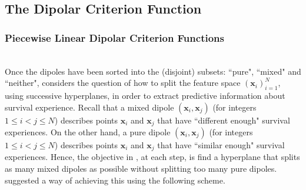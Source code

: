 \documentclass[12pt]{amsart}
\theoremstyle{definition}
\theoremstyle{plain}
\theoremstyle{remark}
\begin{document}
\subsection{The Dipolar Criterion Function}


\subsubsection{Piecewise Linear Dipolar Criterion Functions} \hfill \\


Once the dipoles have been sorted into the (disjoint) subsets: ``pure", ``mixed" and ``neither", \cite{kretowska} considers the question of how to split the feature space $(\mathbf{x}_i)_{i = 1}^N$, using successive hyperplanes, in order to extract predictive information about survival experience. Recall that a mixed dipole $(\mathbf{x}_i, \mathbf{x}_j)$ (for integers $1 \leq i < j \leq N$) describes points $\mathbf{x}_i$ and $\mathbf{x}_j$ that have ``different enough" survival experiences. On the other hand, a pure dipole $(\mathbf{x}_i, \mathbf{x}_j)$ (for integers $1 \leq i < j \leq N$) describes points $\mathbf{x}_i$ and $\mathbf{x}_j$ that have ``similar enough" survival experiences. Hence, the objective in \cite{kretowska}, at each step, is find a hyperplane that splits as many mixed dipoles as possible without splitting too many pure dipoles. \\

\cite{kretowska} suggested a way of achieving this using the following scheme.
\end{document}
